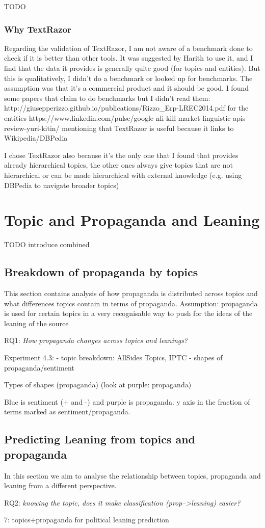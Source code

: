 TODO

\subsubsection{Why TextRazor}
Regarding the validation of TextRazor, I am not aware of a benchmark done to check if it is better than other tools. It was suggested by Harith to use it, and I find that the data it provides is generally quite good (for topics and entities). But this is qualitatively, I didn’t do a benchmark or looked up for benchmarks. The assumption was that it’s a commercial product and it should be good.
I found some papers that claim to do benchmarks but I didn’t read them:
http://giusepperizzo.github.io/publications/Rizzo\_Erp-LREC2014.pdf for the entities
https://www.linkedin.com/pulse/google-nli-kill-market-linguistic-apis-review-yuri-kitin/ mentioning that TextRazor is useful because it links to Wikipedia/DBPedia

I chose TextRazor also because it’s the only one that I found that provides already hierarchical topics, the other ones always give topics that are not hierarchical or can be made hierarchical with external knowledge (e.g. using DBPedia to navigate broader topics)

\section{Topic and Propaganda and Leaning}

TODO introduce combined

\subsection{Breakdown of propaganda by topics}

This section contains analysis of how propaganda is distributed across topics and what differences topics contain in terms of propaganda.
Assumption: propaganda is used for certain topics in a very recognisable way to push for the ideas of the leaning of the source

RQ1: \emph{How propaganda changes across topics and leanings?}

Experiment 4.3: 
- topic breakdown: AllSides Topics, IPTC
- shapes of propaganda/sentiment


Types of shapes (propaganda)
(look at purple: propaganda)

Blue is sentiment (+ and -) and purple is propaganda. 
y axis in the fraction of terms marked as sentiment/propaganda.

\subsection{Predicting Leaning from topics and propaganda}

In this section we aim to analyse the relationship between topics, propaganda and leaning from a different perspective.

RQ2: \emph{knowing the topic, does it make classification (prop-->leaning) easier?}

7: topics+propaganda for political leaning prediction